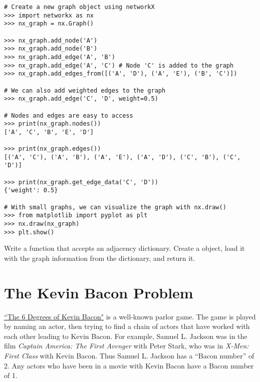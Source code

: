 \begin{lstlisting}
# Create a new graph object using networkX
>>> import networkx as nx
>>> nx_graph = nx.Graph()

>>> nx_graph.add_node('A')
>>> nx_graph.add_node('B')
>>> nx_graph.add_edge('A', 'B')
>>> nx_graph.add_edge('A', 'C') # Node 'C' is added to the graph
>>> nx_graph.add_edges_from([('A', 'D'), ('A', 'E'), ('B', 'C')])

# We can also add weighted edges to the graph
>>> nx_graph.add_edge('C', 'D', weight=0.5)

# Nodes and edges are easy to access
>>> print(nx_graph.nodes())
['A', 'C', 'B', 'E', 'D']

>>> print(nx_graph.edges())
[('A', 'C'), ('A', 'B'), ('A', 'E'), ('A', 'D'), ('C', 'B'), ('C', 'D')]

>>> print(nx_graph.get_edge_data('C', 'D'))
{'weight': 0.5}

# With small graphs, we can visualize the graph with nx.draw()
>>> from matplotlib import pyplot as plt
>>> nx.draw(nx_graph)
>>> plt.show()
\end{lstlisting}

\begin{problem}
Write a function that accepts an adjacency dictionary.
Create a  object, load it with the graph information from the dictionary, and return it.
\end{problem}

\section*{The Kevin Bacon Problem}

\href{http://oracleofbacon.org/help.php}{``The 6 Degrees of Kevin Bacon"} is a well-known parlor game.
The game is played by naming an actor, then trying to find a chain of actors that have worked with each other leading to Kevin Bacon.
For example, Samuel L. Jackson was in the film \emph{Captain America: The First Avenger} with Peter Stark, who was in \emph{X-Men: First Class} with Kevin Bacon.
Thus Samuel L. Jackson has a ``Bacon number'' of 2.
Any actors who have been in a movie with Kevin Bacon have a Bacon number of 1.

